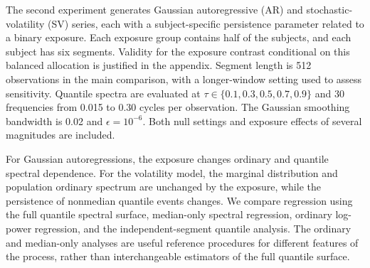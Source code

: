 The second experiment generates Gaussian autoregressive (AR) and stochastic-volatility (SV) series, each with a subject-specific persistence parameter related to a binary exposure. Each exposure group contains half of the subjects, and each subject has six segments. Validity for the exposure contrast conditional on this balanced allocation is justified in the appendix. Segment length is 512 observations in the main comparison, with a longer-window setting used to assess sensitivity. Quantile spectra are evaluated at $\tau\in\{0.1,0.3,0.5,0.7,0.9\}$ and 30 frequencies from 0.015 to 0.30 cycles per observation. The Gaussian smoothing bandwidth is 0.02 and $\epsilon=10^{-6}$. Both null settings and exposure effects of several magnitudes are included.

For Gaussian autoregressions, the exposure changes ordinary and quantile spectral dependence. For the volatility model, the marginal distribution and population ordinary spectrum are unchanged by the exposure, while the persistence of nonmedian quantile events changes. We compare regression using the full quantile spectral surface, median-only spectral regression, ordinary log-power regression, and the independent-segment quantile analysis. The ordinary and median-only analyses are useful reference procedures for different features of the process, rather than interchangeable estimators of the full quantile surface.
